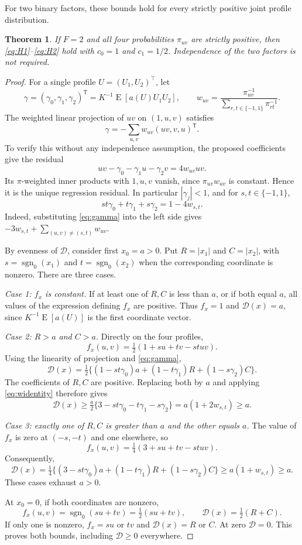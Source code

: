 \documentclass[12pt,a4paper]{article}
\newtheorem{theorem}{Theorem}
\theoremstyle{definition}
\theoremstyle{remark}\newtheorem{remark}{Remark}
\numberwithin{equation}{section}
\newcommand{\E}{\operatorname{E}}
\newcommand{\sg}{\operatorname{sgn}_0}
\newcommand{\trans}{^{\mathsf T}}
\begin{document}
For two binary factors, these bounds hold for every strictly positive joint profile distribution.
\begin{theorem}\label{thm:two}
If $F=2$ and all four probabilities $\pi_{uv}$ are strictly positive, then \eqref{eq:H1}--\eqref{eq:H2} hold with $c_0=1$ and $c_1=1/2$. Independence of the two factors is not required.
\end{theorem}
\begin{proof}
For a single profile $U=(U_1,U_2)^\top$, let
\[
 \gamma=(\gamma_0,\gamma_1,\gamma_2)\trans
     =K^{-1}\E[a(U)U_1U_2],\qquad
 w_{uv}=\frac{\pi_{uv}^{-1}}{\sum_{r,t\in\{-1,1\}}\pi_{rt}^{-1}}.
\]
The weighted linear projection of $uv$ on $(1,u,v)$ satisfies
\begin{equation}\label{eq:gamma}
 \gamma=-\sum_{u,v}w_{uv}(uv,v,u)\trans.
\end{equation}
To verify this without any independence assumption, the proposed coefficients give the residual
\[
 uv-\gamma_0-\gamma_1u-\gamma_2v=4w_{uv}uv.
\]
Its $\pi$-weighted inner products with $1,u,v$ vanish, since $\pi_{uv}w_{uv}$ is constant. Hence it is the unique regression residual. In particular $|\gamma_j|<1$, and for $s,t\in\{-1,1\}$,
\begin{equation}\label{eq:widentity}
 st\gamma_0+t\gamma_1+s\gamma_2=1-4w_{s,t}.
\end{equation}
Indeed, substituting \eqref{eq:gamma} into the left side gives $-3w_{s,t}+\sum_{(u,v)\ne(s,t)}w_{uv}$.

By evenness of $\mathcal D$, consider first $x_0=a>0$. Put $R=|x_1|$ and $C=|x_2|$, with $s=\sg(x_1)$ and $t=\sg(x_2)$ when the corresponding coordinate is nonzero. There are three cases.

\emph{Case 1: $f_x$ is constant.} If at least one of $R,C$ is less than $a$, or if both equal $a$, all values of the expression defining $f_x$ are positive. Thus $f_x=1$ and $\mathcal D(x)=a$, since $K^{-1}\E[a(U)]$ is the first coordinate vector.

\emph{Case 2: $R>a$ and $C>a$.} Directly on the four profiles,
\[
 f_x(u,v)=\tfrac12(1+su+tv-stuv).
\]
Using the linearity of projection and \eqref{eq:gamma},
\[
 \mathcal D(x)=\tfrac12\{(1-st\gamma_0)a+(1-t\gamma_1)R+(1-s\gamma_2)C\}.
\]
The coefficients of $R,C$ are positive. Replacing both by $a$ and applying \eqref{eq:widentity} therefore gives
\[
 \mathcal D(x)\ge\tfrac a2\{3-st\gamma_0-t\gamma_1-s\gamma_2\}
       =a(1+2w_{s,t})\ge a.
\]

\emph{Case 3: exactly one of $R,C$ is greater than $a$ and the other equals $a$.} The value of $f_x$ is zero at $(-s,-t)$ and one elsewhere, so
\[
 f_x(u,v)=\tfrac14(3+su+tv-stuv).
\]
Consequently,
\[
 \mathcal D(x)=\tfrac14\{(3-st\gamma_0)a+(1-t\gamma_1)R+(1-s\gamma_2)C\}
      \ge a(1+w_{s,t})\ge a.
\]
These cases exhaust $a>0$.

At $x_0=0$, if both coordinates are nonzero,
\[
 f_x(u,v)=\sg(su+tv)=\tfrac12(su+tv),\qquad
 \mathcal D(x)=\tfrac12(R+C).
\]
If only one is nonzero, $f_x=su$ or $tv$ and $\mathcal D(x)=R$ or $C$. At zero $\mathcal D=0$. This proves both bounds, including $\mathcal D\ge0$ everywhere.
\end{proof}
\end{document}
